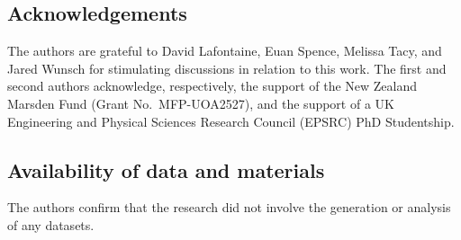 \documentclass{birkjour}
\theoremstyle{definition}
\theoremstyle{remark}
\numberwithin{equation}{section}
\begin{document}
\subsection*{Acknowledgements}
\small The authors are grateful to David Lafontaine, Euan Spence, Melissa Tacy, and Jared Wunsch for stimulating discussions in relation to this work. The first and second authors acknowledge, respectively, the support of the New Zealand Marsden Fund (Grant No.~MFP-UOA2527), and the support of a UK Engineering and Physical Sciences Research Council (EPSRC) PhD Studentship. \normalsize

\subsection*{Availability of data and materials} \small The authors confirm that the research did
not involve the generation or analysis of any datasets.

 






%
%
\end{document}
